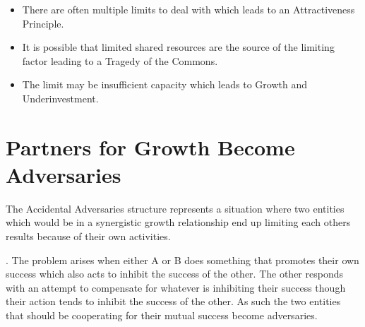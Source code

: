 \documentclass[]{memoir}
\begin{document}
\begin{itemize}
\itemsep1pt\parskip0pt
\item
  There are often multiple limits to deal with which leads to an
  Attractiveness Principle.
\item
  It is possible that limited shared resources are the source of the
  limiting factor leading to a Tragedy of the Commons.
\item
  The limit may be insufficient capacity which leads to Growth and
  Underinvestment.
\end{itemize}

\section{Partners for Growth Become Adversaries}

The Accidental Adversaries structure represents a situation where two
entities which would be in a synergistic growth relationship end up
limiting each others results because of their own activities.

. The problem arises when either A or B does something that promotes
their own success which also acts to inhibit the success of the other.
The other responds with an attempt to compensate for whatever is
inhibiting their success though their action tends to inhibit the
success of the other. As such the two entities that should be
cooperating for their mutual success become adversaries.

\FloatBarrier 
\end{document}
